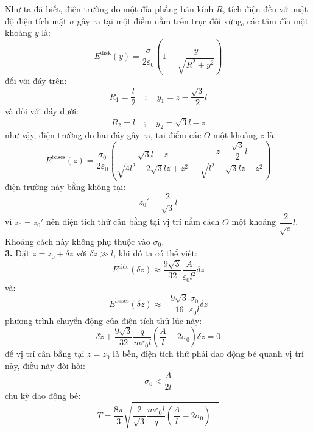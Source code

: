 \noindent Như ta đã biết, điện trường do một đĩa phẳng bán kính $R$, tích điện đều với mật độ điện tích mặt $\sigma$ gây ra tại một điểm nằm trên trục đối xứng, các tâm đĩa một khoảng $y$ là:
\begin{equation*}
  E^{\text{disk}}(y)=\frac{\sigma}{2\varepsilon_{0}}\left(1-\frac{y}{\sqrt{R^{2}+y^{2}}}\right)
\end{equation*}
đối với đáy trên:
\begin{equation*}
  R_{1}=\frac{l}{2}\quad;\quad y_{1}=z-\frac{\sqrt{3}}{2}l
\end{equation*}
và đối với đáy dưới:
\begin{equation*}
  R_{2}=l\quad;\quad y_{2}=\sqrt{3}l-z
\end{equation*}
như vậy, điện trường do hai đáy gây ra, tại điểm các $O$ một khoảng $z$ là:
\begin{equation*}
  E^{\text{bases}}(z)=\frac{\sigma_{0}}{2\varepsilon_{0}}\left(\frac{\sqrt{3}l-z}{\sqrt{4l^{2}-2\sqrt{3}lz+z^{2}}}-\frac{z-\dfrac{\sqrt{3}}{2}l}{\sqrt{l^{2}-\sqrt{3}lz+z^{2}}}\right)
\end{equation*}
điện trường này bằng không tại:
\begin{equation*}
  z_{0}'=\frac{2}{\sqrt{3}}l
\end{equation*}
vì $z_{0}=z_{0}'$ nên điện tích thử cân bằng tại vị trí nằm cách $O$ một khoảng $\dfrac{2}{\sqrt{e}}l$. Khoảng cách này không phụ thuộc vào $\sigma_{0}$.\\

\noindent\textbf{3.} Đặt $z=z_{0}+\delta z$ với $\delta z\gg l$, khi đó ta có thể viết:
\begin{equation*}
  E^{\text{side}}(\delta z)\approx\frac{9\sqrt{3}}{32}\frac{A}{\varepsilon_{0}l^{2}}\delta z
\end{equation*}
và:
\begin{equation*}
  E^{\text{bases}}(\delta z)\approx-\frac{9\sqrt{3}}{16}\frac{\sigma_{0}}{\varepsilon_{0}l}\delta z
\end{equation*}
phương trình chuyển động của điện tích thử lúc này:
\begin{equation*}
  \delta\ddot{z}+\frac{9\sqrt{3}}{32}\frac{q}{m\varepsilon_{0}l}\left(\frac{A}{l}-2\sigma_{0}\right)\delta z=0
\end{equation*}
để vị trí cân bằng tại $z=z_{0}$ là bền, điện tích thử phải dao động bé quanh vị trí này, điều này đòi hỏi:
\begin{equation*}
  \sigma_{0}<\frac{A}{2l}
\end{equation*}
chu kỳ dao động bé:
\begin{equation*}
  T=\frac{8\pi}{3}\sqrt{\frac{2}{\sqrt{3}}\frac{m\varepsilon_{0}l}{q}\left(\frac{A}{l}-2\sigma_{0}\right)^{-1}}
\end{equation*}